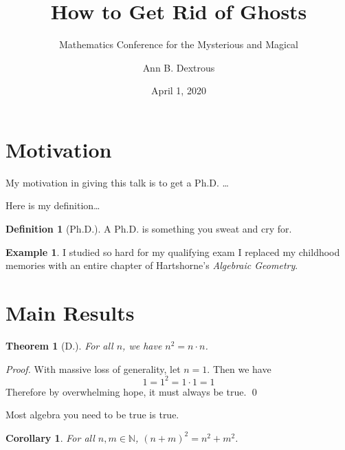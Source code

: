 \documentclass[10pt,dvipsnames]{beamer}
\title{How to Get Rid of Ghosts}
\subtitle{Mathematics Conference for the Mysterious and Magical}
\author{Ann B. Dextrous}
\date{April 1, 2020}
\institute{UC Sunnydale \\ Other Title \\ Or Date Here?}
\theoremstyle{plain}
\newtheorem{thm}{Theorem}[section]
\newtheorem{cor}{Corollary}[section]
\theoremstyle{definition}
\newtheorem{ex}{Example}[section]
\newtheorem{dfn}{Definition}[section]
\theoremstyle{remark}
\numberwithin{equation}{section}
\newcommand{\N}{\mathbb{N}}
\newcommand{\pf}{\noindent\emph{Proof. }}
\begin{document}
\maketitle



\section{Motivation}



\begin{frame}
My motivation in giving this talk is to get a Ph.D. \dots
\end{frame}



\begin{frame}
Here is my definition\dots

\begin{dfn}[Ph.D.]
A Ph.D. is something you sweat and cry for.
\end{dfn}

\begin{ex}
I studied so hard for my qualifying exam I replaced my childhood memories with an entire chapter of Hartshorne's \emph{Algebraic Geometry}.
\end{ex}
\end{frame}



\section{Main Results}



\begin{frame}
\begin{thm}[D.]
For all $n$, we have $n^2= n \cdot n$.
\end{thm}

\pf With massive loss of generality, let $n=1$. Then we have
	\[
	1=1^2= 1 \cdot 1= 1
	\]
Therefore by overwhelming hope, it must always be true. \qed
\end{frame}



\begin{frame}
Most algebra you need to be true is true.
\begin{cor}
For all $n,m \in \N$, $(n+m)^2= n^2 + m^2$.
\end{cor}
\end{frame}
\end{document}
